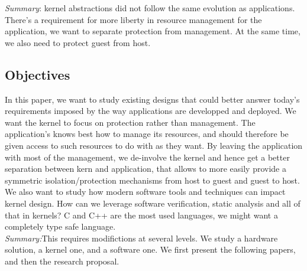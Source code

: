 \textit{Summary}: kernel abstractions did not follow the same evolution as applications.
There's a requirement for more liberty in resource management for the application, we want to separate protection from management.
At the same time, we also need to protect guest from host.

\subsection{Objectives}
 In this paper, we want to study existing designs that could better answer today's requirements imposed by the way applications are developped and deployed.
 We want the kernel to focus on protection rather than management.
 The application's knows best how to manage its resources, and should therefore be given access to such resources to do with as they want.
 By leaving the application with most of the management, we de-involve the kernel and hence get a better separation between kern and application, that allows to more easily provide a symmetric isolation/protection mechanisms from host to guest and guest to host.
 We also want to study how modern software tools and techniques can impact kernel design.
 How can we leverage software verification, static analysis and all of that in kernels? 
 C and C++ are the most used languages, we might want a completely type safe language.\\

 \textit{Summary:}This requires modifictions at several levels.
 We study a hardware solution, a kernel one, and a software one.
 We first present the following papers, and then the research proposal.


 
